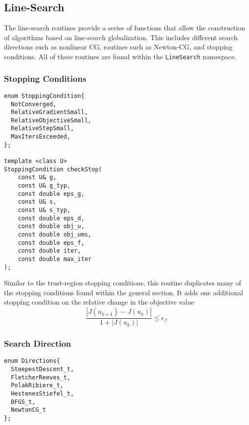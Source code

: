 \documentclass{article}
\begin{document}
\subsection{Line-Search}

	The line-search routines provide a series of functions that allow the construction of algorithms based on line-search globalization.  This includes different search directions such as nonlinear CG, routines such as Newton-CG, and stopping conditions.  All of these routines are found within the \texttt{LineSearch} namespace.

\subsubsection{Stopping Conditions}

\begin{flushleft}
\begin{lstlisting}
enum StoppingCondition{
  NotConverged,               
  RelativeGradientSmall,     
  RelativeObjectiveSmall,   
  RelativeStepSmall,       
  MaxItersExceeded,       
};

template <class U>
StoppingCondition checkStop(
    const U& g,
    const U& g_typ,
    const double eps_g,
    const U& s,
    const U& s_typ,
    const double eps_d,
    const double obj_u,
    const double obj_ums,
    const double eps_f,
    const double iter,
    const double max_iter
);
\end{lstlisting}
\end{flushleft}

Similar to the trust-region stopping conditions, this routine duplicates many of the stopping conditions found within the general section.  It adds one additional stopping condition on the relative change in the objective value
$$
	\frac{|J(u_{k+1})-J(u_k)|}{1+|J(u_k)|}\leq\epsilon_f.
$$

\subsubsection{Search Direction}

\begin{flushleft}
\begin{lstlisting}
enum Directions{
  SteepestDescent_t,  
  FletcherReeves_t,   
  PolakRibiere_t,     
  HestenesStiefel_t,  
  BFGS_t,             
  NewtonCG_t         
};
\end{lstlisting}
\end{flushleft}
\end{document}

